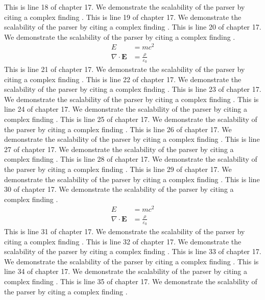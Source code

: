 This is line 18 of chapter 17. We demonstrate the scalability of the parser by citing a complex finding \cite{ref17_18}.
This is line 19 of chapter 17. We demonstrate the scalability of the parser by citing a complex finding \cite{ref17_19}.
This is line 20 of chapter 17. We demonstrate the scalability of the parser by citing a complex finding \cite{ref17_20}.
\begin{align*}
  E &= mc^2 \\
  \nabla \cdot \mathbf{E} &= \frac{\rho}{\varepsilon_0}
\end{align*}
This is line 21 of chapter 17. We demonstrate the scalability of the parser by citing a complex finding \cite{ref17_21}.
This is line 22 of chapter 17. We demonstrate the scalability of the parser by citing a complex finding \cite{ref17_22}.
This is line 23 of chapter 17. We demonstrate the scalability of the parser by citing a complex finding \cite{ref17_23}.
This is line 24 of chapter 17. We demonstrate the scalability of the parser by citing a complex finding \cite{ref17_24}.
This is line 25 of chapter 17. We demonstrate the scalability of the parser by citing a complex finding \cite{ref17_25}.
This is line 26 of chapter 17. We demonstrate the scalability of the parser by citing a complex finding \cite{ref17_26}.
This is line 27 of chapter 17. We demonstrate the scalability of the parser by citing a complex finding \cite{ref17_27}.
This is line 28 of chapter 17. We demonstrate the scalability of the parser by citing a complex finding \cite{ref17_28}.
This is line 29 of chapter 17. We demonstrate the scalability of the parser by citing a complex finding \cite{ref17_29}.
This is line 30 of chapter 17. We demonstrate the scalability of the parser by citing a complex finding \cite{ref17_30}.
\begin{align*}
  E &= mc^2 \\
  \nabla \cdot \mathbf{E} &= \frac{\rho}{\varepsilon_0}
\end{align*}
This is line 31 of chapter 17. We demonstrate the scalability of the parser by citing a complex finding \cite{ref17_31}.
This is line 32 of chapter 17. We demonstrate the scalability of the parser by citing a complex finding \cite{ref17_32}.
This is line 33 of chapter 17. We demonstrate the scalability of the parser by citing a complex finding \cite{ref17_33}.
This is line 34 of chapter 17. We demonstrate the scalability of the parser by citing a complex finding \cite{ref17_34}.
This is line 35 of chapter 17. We demonstrate the scalability of the parser by citing a complex finding \cite{ref17_35}.
